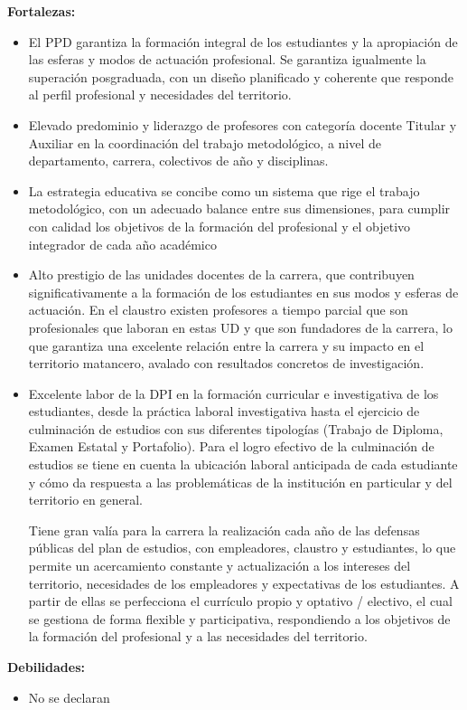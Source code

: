 \textbf{Fortalezas:}
\begin{itemize}
	\setlength\itemsep{-0.5em}
	\item El PPD garantiza la formación integral de los estudiantes y la apropiación de las esferas y modos de actuación profesional. Se garantiza igualmente la superación posgraduada, con un diseño planificado y coherente que responde al perfil profesional y necesidades del territorio.  
	\item Elevado predominio y liderazgo de profesores con categoría docente Titular y Auxiliar en la coordinación del trabajo metodológico, a nivel de departamento, carrera, colectivos de año y disciplinas.
	\item La estrategia educativa se concibe como un sistema que rige el trabajo metodológico, con un adecuado balance entre sus dimensiones, para cumplir con calidad los objetivos de la formación del profesional y el objetivo integrador de cada año académico
	\item Alto prestigio de las unidades docentes de la carrera, que contribuyen significativamente a la formación de los estudiantes en sus modos y esferas de actuación. En el claustro existen profesores a tiempo parcial que son profesionales que laboran en estas UD y que son fundadores de la carrera, lo que garantiza una excelente relación entre la carrera y su impacto en el territorio matancero, avalado con resultados concretos de investigación. 
	\item Excelente labor de la DPI en la formación curricular e investigativa de los estudiantes, desde la práctica laboral investigativa hasta el ejercicio de culminación de estudios con sus diferentes tipologías (Trabajo de Diploma, Examen Estatal y Portafolio). Para el logro efectivo de la culminación de estudios se tiene en cuenta la ubicación laboral anticipada de cada estudiante y cómo da respuesta a las problemáticas de la institución en particular y del territorio en general.
	
	Tiene gran valía para la carrera la realización cada año de las defensas públicas del plan de estudios, con empleadores, claustro y estudiantes, lo que permite un acercamiento constante y actualización a los intereses del territorio, necesidades de los empleadores y expectativas de los estudiantes. A partir de ellas se perfecciona el currículo propio y optativo / electivo, el cual se gestiona de forma flexible y participativa, respondiendo a los objetivos de la formación del profesional y a las necesidades del territorio.
\end{itemize}


\textbf{Debilidades:}
\begin{itemize}
	\setlength\itemsep{-0.5em}
	\item No se declaran 
\end{itemize}